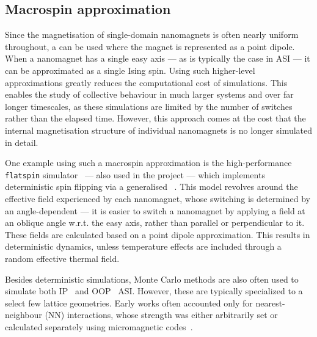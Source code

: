 \subsection{Macrospin approximation}\label{sec:1:Modelling_macrospin}
Since the magnetisation of single-domain nanomagnets is often nearly uniform throughout, a  can be used where the magnet is represented as a point dipole.
When a nanomagnet has a single easy axis --- as is typically the case in ASI --- it can be approximated as a single Ising spin.
Using such higher-level approximations greatly reduces the computational cost of simulations.
This enables the study of collective behaviour in much larger systems and over far longer timescales, as these simulations are limited by the number of switches rather than the elapsed time.
However, this approach comes at the cost that the internal magnetisation structure of individual nanomagnets is no longer simulated in detail. \par
One example using such a macrospin approximation is the high-performance \texttt{flatspin} simulator~\cite{flatspin} --- also used in the \spinengine project --- which implements deterministic spin flipping via a generalised ~\cite{StonerWohlfarth2008}.
This model revolves around the effective field experienced by each nanomagnet, whose switching is determined by an angle-dependent  --- it is easier to switch a nanomagnet by applying a field at an oblique angle w.r.t. the easy axis, rather than parallel or perpendicular to it.
These fields are calculated based on a point dipole approximation.
This results in deterministic dynamics, unless temperature effects are included through a random effective thermal field. \par
Besides deterministic simulations, Monte Carlo methods are also often used to simulate both IP~\cite{Qi2008,Cugliandolo2017,LocalizedFrustratedKagome,Brunn2021,Farhan2013,ApparentFMpinwheel} and OOP~\cite{Chioar2014,PerpendicularMagnetizationASI} ASI. %
However, these are typically specialized to a select few lattice geometries.
Early works often accounted only for nearest-neighbour (NN) interactions, whose strength was either arbitrarily set or calculated separately using micromagnetic codes~\cite{Qi2008,PerpendicularMagnetizationASI}. %
